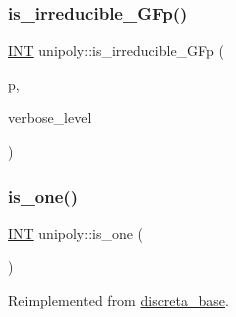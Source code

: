 \mbox{\label{classunipoly_a9f17f20ea6bc30581159151ebe849f6b}} 
\subsubsection{\texorpdfstring{is\+\_\+irreducible\+\_\+\+G\+Fp()}{is\_irreducible\_GFp()}}
{\footnotesize\ttfamily \mbox{\hyperlink{galois_8h_a09fddde158a3a20bd2dcadb609de11dc}{I\+NT}} unipoly\+::is\+\_\+irreducible\+\_\+\+G\+Fp (\begin{DoxyParamCaption}\item[{\mbox{\hyperlink{galois_8h_a09fddde158a3a20bd2dcadb609de11dc}{I\+NT}}}]{p,  }\item[{\mbox{\hyperlink{galois_8h_a09fddde158a3a20bd2dcadb609de11dc}{I\+NT}}}]{verbose\+\_\+level }\end{DoxyParamCaption})}

\mbox{\label{classunipoly_a1840dc8eb1a17b1764b108c96299738d}} 
\subsubsection{\texorpdfstring{is\+\_\+one()}{is\_one()}}
{\footnotesize\ttfamily \mbox{\hyperlink{galois_8h_a09fddde158a3a20bd2dcadb609de11dc}{I\+NT}} unipoly\+::is\+\_\+one (\begin{DoxyParamCaption}{ }\end{DoxyParamCaption})\hspace{0.3cm}{\ttfamily [virtual]}}



Reimplemented from \mbox{\hyperlink{classdiscreta__base_a28fa37aac83194174888d34f07f43848}{discreta\+\_\+base}}.

\mbox{\label{classunipoly_a6abce01baf319f3857dc5c674e58687d}} 
